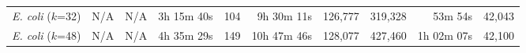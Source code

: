 \begin{sidewaystable}
\begin{tabular}{|c|r|r|r|r|r|r|r|r|r|}

    
    \emph{E. coli} ($k$=32)         & N/A & N/A & 3h 15m 40s & 104 & 9h 30m 11s & 126,777 & 319,328 &  53m 54s & 42,043 \\



    \emph{E. coli} ($k$=48)         & N/A & N/A & 4h 35m 29s & 149 & 10h 47m 46s & 128,077 & 427,460 & 1h 02m 07s & 42,100 \\


\end{tabular}
\end{sidewaystable}
